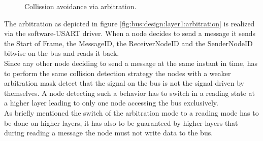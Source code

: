 \begin{figure}[h]
\begin{center}
\end{center}
\caption{Collission avoidance via arbitration.}
\end{figure}

The arbitration as depicted in figure \ref{fig:bus:design:layer1:arbitration} 
is realized via the software-USART driver. 
When a node decides to send a message it sends the Start of Frame, the MessageID, 
the ReceiverNodeID and the SenderNodeID bitwise on the bus and reads it back.\\

Since any other node deciding to send a message at the same instant in time, 
has to perform the same collision detection strategy the nodes with a weaker 
arbitration mask detect that the signal on the bus is not the signal driven by themselves.
A node detecting such a behavior has to switch in a reading state 
at a higher layer leading to only one node accessing the bus exclusively.\\

As briefly mentioned the switch of the arbitration mode to a reading 
mode has to be done on higher layers, it has also to be guaranteed 
by higher layers that during reading a message the node must not write data to the bus.
